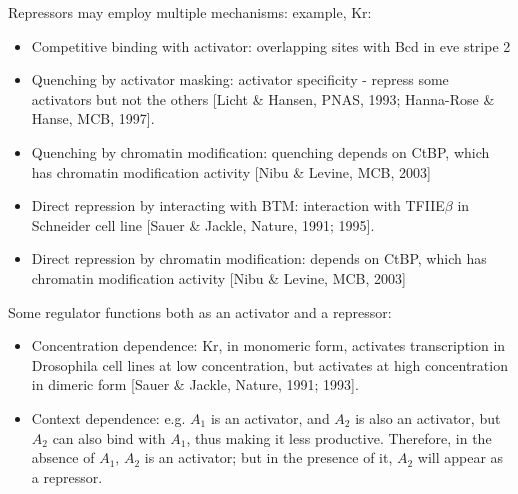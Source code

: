 \documentclass{report}
\begin{document}
Repressors may employ multiple mechanisms: example, Kr:
\begin{itemize}
	\item Competitive binding with activator: overlapping sites with Bcd in eve stripe 2
	\item Quenching by activator masking: activator specificity - repress some activators but not the others [Licht \& Hansen, PNAS, 1993; Hanna-Rose \& Hanse, MCB, 1997]. 
	\item Quenching by chromatin modification: quenching depends on CtBP, which has chromatin modification activity [Nibu \& Levine, MCB, 2003]
	\item Direct repression by interacting with BTM: interaction with TFIIE$\beta$ in Schneider cell line [Sauer \& Jackle, Nature, 1991; 1995]. 
	\item Direct repression by chromatin modification: depends on CtBP, which has chromatin modification activity [Nibu \& Levine, MCB, 2003]
\end{itemize} 

Some regulator functions both as an activator and a repressor: 
\begin{itemize}
	\item Concentration dependence: Kr, in monomeric form, activates transcription in Drosophila cell lines at low concentration, but activates at high concentration in dimeric form [Sauer \& Jackle, Nature, 1991; 1993].
	\item Context dependence: e.g. $A_1$ is an activator, and $A_2$ is also an activator, but $A_2$ can also bind with $A_1$, thus making it less productive. Therefore, in the absence of $A_1$, $A_2$ is an activator; but in the presence of it, $A_2$ will appear as a repressor. 
\end{itemize}
\end{document}
